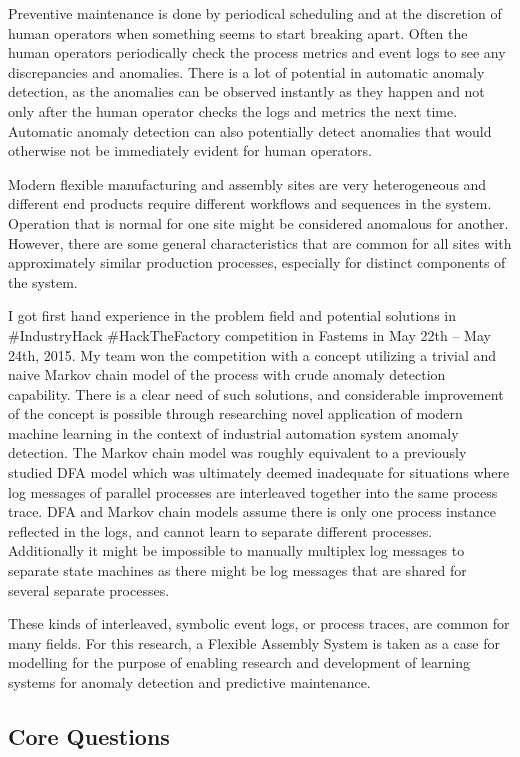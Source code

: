 \documentclass[a4paper,12pt]{article}
\begin{document}
Preventive maintenance is done by periodical scheduling and at the discretion of human operators when something seems to start breaking apart.
Often the human operators periodically check the process metrics and event logs to see any discrepancies and anomalies. There is a lot of potential in automatic anomaly
detection, as the anomalies can be observed instantly as they happen and not only after the human operator checks the logs and metrics the next time. Automatic
anomaly detection can also potentially detect anomalies that would otherwise not be immediately evident for human operators.

Modern flexible manufacturing and assembly sites are very heterogeneous and different end products require different workflows and sequences in the system. Operation that is normal
for one site might be considered anomalous for another. However, there are some general characteristics that are common for all sites with approximately similar
production processes, especially for distinct components of the system.

I got first hand experience in the problem field and potential solutions in \#IndustryHack \#HackTheFactory competition in Fastems in May 22th – May 24th, 2015\cite{IndustryHack}.
My team won the competition with a concept utilizing a trivial and naive Markov chain model of the process with crude anomaly detection capability.
There is a clear need of such solutions, and considerable improvement of the concept is possible through researching novel application of modern machine learning in the context
of industrial automation system anomaly detection. The Markov chain model was roughly equivalent to a previously studied DFA model\cite{langer2011self} which was
ultimately deemed inadequate for
situations where log messages of parallel processes are interleaved together into the same process trace. DFA and Markov chain models assume there is only one process instance
reflected in the logs, and cannot learn to separate different processes. Additionally it might be impossible to manually multiplex log messages to separate state machines
as there might be log messages that are shared for several separate processes.

These kinds of interleaved, symbolic event logs, or process traces, are common for many fields. For this research, a Flexible Assembly System is taken as a case for modelling for
the purpose of enabling research and development of learning systems for anomaly detection and predictive maintenance.

\subsection{Core Questions}
\end{document}
